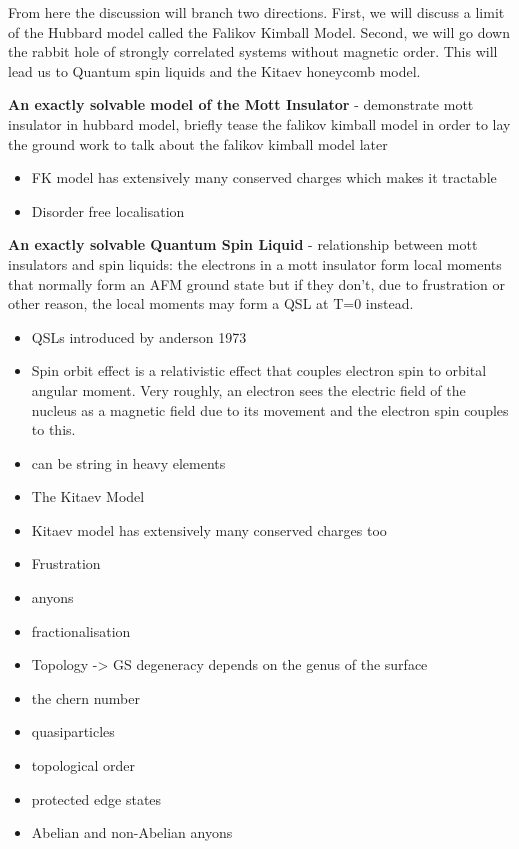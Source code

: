 From here the discussion will branch two directions. First, we will discuss a limit of the Hubbard model called the Falikov Kimball Model. Second, we will go down the rabbit hole of strongly correlated systems without magnetic order. This will lead us to Quantum spin liquids and the Kitaev honeycomb model.

\textbf{An exactly solvable model of the Mott Insulator} - demonstrate mott insulator in hubbard model, briefly tease the falikov kimball model in order to lay the ground work to talk about the falikov kimball model later

\begin{itemize}
\tightlist
\item
  FK model has extensively many conserved charges which makes it tractable
\item
  Disorder free localisation
\end{itemize}

\textbf{An exactly solvable Quantum Spin Liquid} - relationship between mott insulators and spin liquids: the electrons in a mott insulator form local moments that normally form an AFM ground state but if they don't, due to frustration or other reason, the local moments may form a QSL at T=0 instead. \autocite{law1TTaS2QuantumSpin2017,ribakGaplessExcitationsGround2017}

\begin{itemize}
\item
  QSLs introduced by anderson 1973 \autocite{andersonResonatingValenceBonds1973}
\item
  Spin orbit effect is a relativistic effect that couples electron spin to orbital angular moment. Very roughly, an electron sees the electric field of the nucleus as a magnetic field due to its movement and the electron spin couples to this.
\item
  can be string in heavy elements
\item
  The Kitaev Model
\item
  Kitaev model has extensively many conserved charges too
\item
  Frustration
\item
  anyons
\item
  fractionalisation
\item
  Topology -\textgreater{} GS degeneracy depends on the genus of the surface
\item
  the chern number
\item
  quasiparticles
\item
  topological order
\item
  protected edge states
\item
  Abelian and non-Abelian anyons
\end{itemize}

